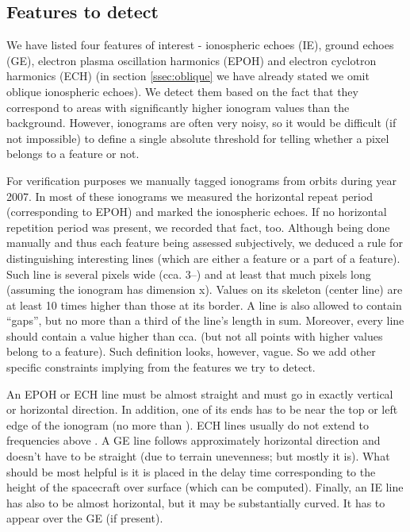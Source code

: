 \subsection{Features to detect}
We have listed four features of interest - ionospheric echoes (IE), ground echoes (GE), electron plasma oscillation harmonics (EPOH) and electron cyclotron harmonics (ECH) (in section \ref{ssec:oblique} we have already stated we omit oblique ionospheric echoes). We detect them based on the fact that they correspond to areas with significantly higher ionogram values than the background. However, ionograms are often very noisy, so it would be difficult (if not impossible) to define a single absolute threshold for telling whether a pixel belongs to a feature or not. 

For verification purposes we manually tagged  ionograms from  orbits during year 2007. In most of these ionograms we measured the horizontal repeat period (corresponding to EPOH) and marked the ionospheric echoes. If no horizontal repetition period was present, we recorded that fact, too. Although being done manually and thus each feature being assessed subjectively, we deduced a rule for distinguishing interesting lines (which are either a feature or a part of a feature). Such line is several pixels wide (cca. 3--) and at least that much pixels long (assuming the ionogram has dimension x). Values on its skeleton (center line) are at least 10 times higher than those at its border. A line is also allowed to contain ``gaps'', but no more than a third of the line's length in sum. Moreover, every line should contain a value higher than cca.  (but not all points with higher values belong to a feature). Such definition looks, however, vague. So we add other specific constraints implying from the features we try to detect. 

An EPOH or ECH line must be almost straight and must go in exactly vertical or horizontal direction. In addition, one of its ends has to be near the top or left edge of the ionogram (no more than ). ECH lines usually do not extend to frequencies above . A GE line follows approximately horizontal direction and doesn't have to be straight (due to terrain unevenness; but mostly it is). What should be most helpful is it is placed in the delay time corresponding to the height of the spacecraft over surface (which can be computed). Finally, an IE line has also to be almost horizontal, but it may be substantially curved. It has to appear over the GE (if present).

